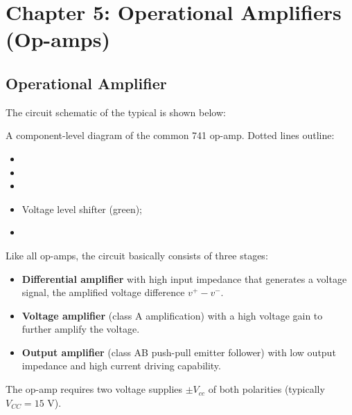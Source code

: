 \documentclass{article}
\begin{document}
\section*{Chapter 5: Operational Amplifiers (Op-amps)}

\subsection*{Operational Amplifier}

The circuit schematic of the typical 
 is shown below:



A component-level diagram of the common 741 op-amp. Dotted lines outline: 
\begin{itemize}
\item {}
\item {}
\item {}
\item Voltage level shifter (green); 
\item {}
\end{itemize}


Like all op-amps, the circuit basically consists of three stages:
\begin{itemize}
\item {\bf Differential amplifier} with high input impedance that generates
  a voltage signal, the amplified voltage difference $v^+-v^-$.
\item {\bf Voltage amplifier} (class A amplification) with a high voltage gain 
  to further amplify the voltage.
\item {\bf Output amplifier} (class AB push-pull emitter follower) with low 
  output impedance and high current driving capability.
\end{itemize}
The op-amp requires two voltage supplies $\pm V_{cc}$ of both polarities 
(typically $V_{CC}=15$ V). 
\end{document}

